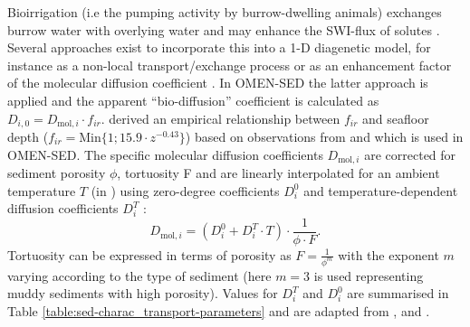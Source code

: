 \documentclass[gmd, manuscript]{copernicus}
\begin{document}
Bioirrigation (i.e the pumping activity by burrow-dwelling animals) exchanges burrow water with overlying water and may enhance the SWI-flux of solutes \citep{aller_importance_1984, aller1988benthic}. 
Several approaches exist to incorporate this into a 1-D diagenetic model, for instance as a non-local transport/exchange process \citep{boudreau_equivalence_1984, emerson_sediment-water_1984} 
or as an enhancement factor of the molecular diffusion coefficient \citep{devol_benthic_1993, soetaert_model_1996}. In OMEN-SED the latter approach is applied and the 
apparent ``bio-diffusion'' coefficient is calculated as $D_{i,0}=D_{\mathrm{mol},i}\cdot f_{ir}$. 
\citet{soetaert_model_1996} derived an empirical relationship between $f_{ir}$ and seafloor depth ($f_{ir} = \mathrm{Min}\{1; 15.9\cdot z^{-0.43}\}$) 
based on observations from \citet{archer_benthic_1992} and \citet{devol_benthic_1993} which is used in OMEN-SED. 
The specific molecular diffusion coefficients $D_{\mathrm{mol},i}$ are corrected for sediment porosity $\phi$, tortuosity F and are linearly interpolated for an ambient 
temperature $T$ (in \textcelsius) using zero-degree coefficients $D^0_i$ and temperature-dependent diffusion coefficients $D^T_i$ \citep[][]{soetaert_model_1996}:
\begin{equation*}
 D_{\mathrm{mol},i} = (D^0_i + D^T_i \cdot T )\cdot \frac{1}{\phi\cdot F}.
\end{equation*}
Tortuosity can be expressed in terms of porosity as $F = \frac{1}{\phi^m}$ \citep{ullman_diffusion_1982} with the exponent $m$ varying according to the type of sediment (here $m=3$ is used representing muddy sediments with high porosity). 
Values for $D^T_i$ and $D^0_i$ are summarised in Table \ref{table:sed-charac_transport-parameters} and are adapted from \citet{Li_diffusion_1974}, \citet{schulz_quantification_2006} and \citet{gypens_simple_2008}.
\end{document}
